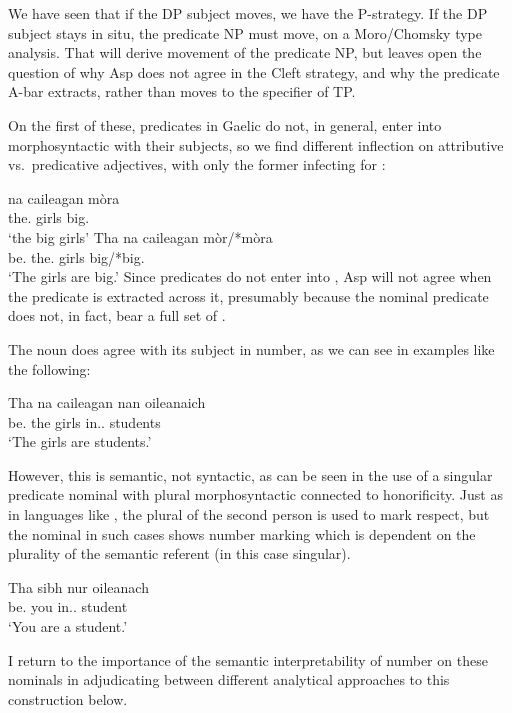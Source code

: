 \documentclass[output=paper]{langsci/langscibook}
\begin{document}
We have seen that if the DP
subject moves, we have the P-strategy. If the DP subject stays in situ, the
predicate NP must move, on a Moro/Chomsky type analysis. That will derive
movement of the predicate NP, but leaves open the question of why Asp does not
agree in the Cleft strategy, and why the predicate A-bar extracts, rather than
moves to the specifier of TP.

On the first of these, predicates in Gaelic do not, in general, enter into
morphosyntactic  with their subjects, so we find different inflection on attributive vs.\ predicative
adjectives, with only the former infecting for :

\ea {}
\ea \gll na caileagan m\`ora\\
the.\Pl{} girls big.\Pl{}\\
\glt \enquote*{the big girls}
\ex \gll Tha na caileagan m\`or/*m\`ora\\
be.\Prs{} the.\Pl{} girls big/*big.\Pl{}\\
\glt \enquote*{The girls are big.}
\z
\z
Since predicates do not enter into , Asp will not agree when the
predicate is extracted across it, presumably because the nominal predicate does
not, in fact, bear a full set of .

The noun does agree with its subject in number, as we can see in examples like
the following:

\ea {}
\sn\gll Tha na caileagan nan oileanaich \\
be.\Prs{} the girls in.\Poss.\Tpl{} students\\
\glt \enquote*{The girls are students.}
\z

However, this  is semantic, not syntactic, as can be seen in the use
of a singular predicate nominal with plural morphosyntactic  connected
to honorificity. Just as in languages like , the plural of the second
person is used to mark respect, but the nominal in such cases shows number
marking which is dependent on the plurality of the semantic referent (in this
case singular).

\ea {}
\sn \gll Tha sibh nur oileanach \\
be.\Prs{} you in.\Poss.\Spl{} student\\
\glt \enquote*{You are a student.}
\z

I return to the importance of the semantic interpretability of number on these
nominals in adjudicating between different analytical approaches to this
construction below.
\end{document}
